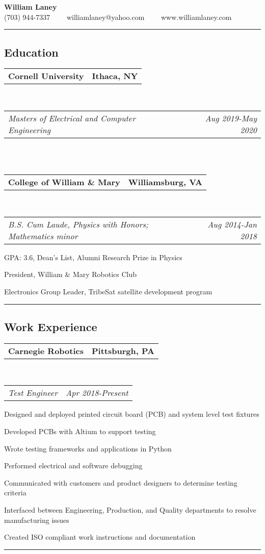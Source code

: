 \documentclass[10pt,letterpaper]{article}
\makeatletter
\newcommand{\headerrow}[2]
{\begin{tabular*}{\linewidth}{l@{\extracolsep{\fill}}r}
	#1 &
	#2 \\
\end{tabular*}}
\makeatother
\begin{document}
\begin{center}
{\LARGE \textbf{William Laney}}\\
\vspace{0.1em}
(703) 944-7337\ \ \textbullet
\ \ williamlaney@yahoo.com\ \ \textbullet
\ \ www.williamlaney.com
\end{center}

\hrule
\vspace{-0.4em}
\subsection*{Education}
	\headerrow
		{\textbf{Cornell University}}
		{\textbf{Ithaca, NY}}
		\\
	\headerrow
		{\emph{Masters of Electrical and Computer Engineering}}
		{\emph{Aug 2019-May 2020}}
	\\
	\\
	\headerrow
		{\textbf{College of William \& Mary}}
		{\textbf{Williamsburg, VA}}
	\\
	\headerrow
		{\emph{B.S. Cum Laude, Physics with Honors; Mathematics minor}}
		{\emph{Aug 2014-Jan 2018}}
	\begin{itemize*}
		\item GPA: 3.6, Dean's List, Alumni Research Prize in Physics
		\item President, William \& Mary Robotics Club
		\item Electronics Group Leader, TribeSat satellite development program
	\end{itemize*}


\hrule
\vspace{-0.4em}
\subsection*{Work Experience}
\headerrow
		{\textbf{Carnegie Robotics}}
		{\textbf{Pittsburgh, PA}}
	\\
	\headerrow
		{\emph{Test Engineer}}
		{\emph{Apr 2018-Present}}
	\begin{itemize*}
		\item Designed and deployed printed circuit board (PCB) and system level test fixtures
		\item Developed PCBs with Altium to support testing
		\item Wrote testing frameworks and applications in Python
		\item Performed electrical and software debugging
		\item Communicated with customers and product designers to determine testing criteria
		\item Interfaced between Engineering, Production, and Quality departments to resolve manufacturing issues
		\item Created ISO compliant work instructions and documentation
	\end{itemize*}
\hrule
\vspace{-0.4em}
\end{document}
